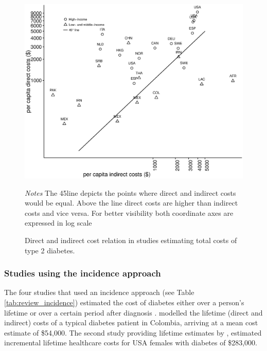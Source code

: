 \begin{figure}[p]
\caption{\label{fig:review_direct_indirect}Direct and indirect cost relation in studies estimating total costs of type 2 diabetes.}%
\begin{minipage}{\linewidth}
\begin{center}
\includegraphics[width=1\linewidth]{Review/Figures/Fig4.eps}\\
\end{center}
\footnotesize
\textit{Notes} The 45\degree line depicts the points where direct and indirect costs would be equal. Above the line direct costs are higher than indirect costs and vice versa. For better visibility both coordinate axes are expressed in log scale
\end{minipage}
\end{figure}

\subsubsection{Studies using the incidence approach}
The four studies that used an incidence approach (see Table \ref{tab:review_incidence}) estimated the cost of diabetes either over a person's lifetime \parencite{Gonzalez2009b,Birnbaum2003c} or over a certain period after diagnosis \parencite{Johnson2006d,Martin2007b}. \textcite{Gonzalez2009b} modelled the lifetime (direct and indirect) costs of a typical diabetes patient in Colombia, arriving at a mean cost estimate of \$54,000. The second study providing lifetime estimates by \textcite{Birnbaum2003c}, estimated incremental lifetime healthcare costs for USA females with diabetes of \$283,000.

